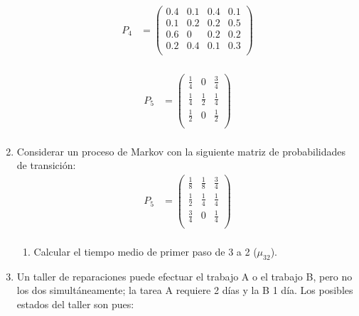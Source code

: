 \documentclass{templateNote}
\begin{document}
\begin{enumerate}
    \begin{align*}
        P_4 &= \left(
            \begin{array}{cccc}    
                0.4&0.1&0.4&0.1\\
                0.1&0.2&0.2&0.5\\
                0.6&0&0.2&0.2\\
                0.2&0.4&0.1&0.3\\
            \end{array}
            \right)\\
    \end{align*}
    
    \begin{align*}
        P_5 &= \left(
            \begin{array}{ccc}    
                \frac{1}{4}   &  0  & \frac{3}{4}  \\
                \frac{1}{4} & \frac{1}{2} & \frac{1}{4}  \\
                \frac{1}{2} & 0 & \frac{1}{2}\\
            \end{array}
            \right)\\
    \end{align*}


    \newpage
    \item Considerar un proceso de Markov con la siguiente matriz de probabilidades de transición:
    \begin{align*}
    P_5 &= \left(
        \begin{array}{ccc}    
            \frac{1}{8}   &  \frac{1}{8}    & \frac{3}{4}  \\
            \frac{1}{2}   &  \frac{1}{4}    & \frac{1}{4}  \\
            \frac{3}{4}   &       0         & \frac{1}{4}\\
        \end{array}
        \right)\\
    \end{align*}

    \begin{enumerate}[label=\alph*)]
        \item Calcular el tiempo medio de primer paso de 3 a 2 ($\mu_{32}$).
    \end{enumerate}

    
    \newpage
    \item Un taller de reparaciones puede efectuar el trabajo A o el trabajo B, pero no los dos
    simultáneamente; la tarea A requiere 2 días y la B 1 día. Los posibles estados del taller son
    pues:


\end{enumerate}
\end{document}
